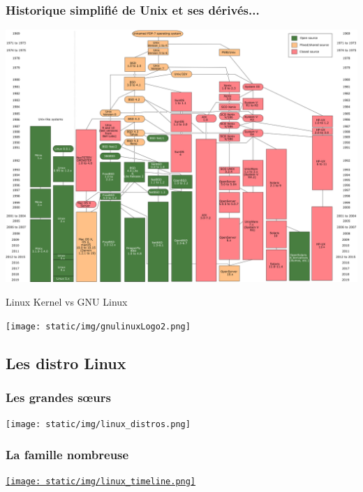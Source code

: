 \documentclass{beamer}
\begin{document}
\begin{frame}
	\frametitle{Historique simplifié de Unix et ses dérivés...}
	
	\begin{center}
		\includegraphics[width=\linewidth]{static/img/Unix_history-simple.png}
	\end{center}
\end{frame}

\begin{frame}
	\begin{center}
		Linux Kernel vs GNU Linux
		
		\texttt{[image: static/img/gnulinuxLogo2.png]}
	\end{center}
\end{frame}

\subsection{Les distro Linux}

\begin{frame}
	\frametitle{Les grandes sœurs}
	
	\begin{center}
		\texttt{[image: static/img/linux\_distros.png]}
	\end{center}
\end{frame}

\begin{frame}
	\frametitle{La famille nombreuse}
	
	\begin{center}
		\href{https://upload.wikimedia.org/wikipedia/commons/b/b5/Linux_Distribution_Timeline_21_10_2021.svg}{\texttt{[image: static/img/linux\_timeline.png]}}
	\end{center}
\end{frame}
\end{document}
